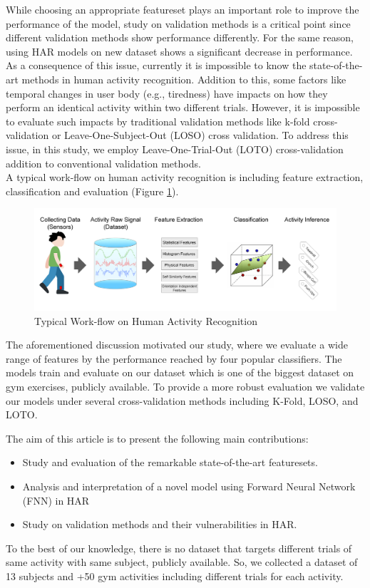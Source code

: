 \documentclass[journal,article,submit,moreauthors,pdftex]{Definitions/mdpi}
\begin{document}
While choosing an appropriate featureset plays an important role to improve the performance of the model, study on validation methods is a critical point since different validation methods show performance differently. For the same reason, using HAR models on new dataset shows a significant decrease in performance. As a consequence of this issue, currently it is impossible to know the state-of-the-art methods in human activity recognition\cite{jordao2018human}. Addition to this, some factors like temporal changes in user body (e.g., tiredness) have impacts on how they perform an identical activity within two different trials. However, it is impossible to evaluate such impacts by traditional validation methods like k-fold cross-validation or Leave-One-Subject-Out (LOSO) cross validation. To address this issue, in this study, we employ Leave-One-Trial-Out (LOTO) cross-validation addition to conventional validation methods.\\

A typical work-flow on human activity recognition is including feature extraction, classification and evaluation (Figure \ref{fig:main_approach}).

\begin{figure}[H]
	\centering
	\includegraphics[width=14 cm]{Definitions/images/main_approach.jpg}
	\caption{Typical Work-flow on Human Activity Recognition}
	\label{fig:main_approach}
\end{figure} 


The aforementioned discussion motivated our study, where we evaluate a wide range of features by the performance reached by four popular classifiers. The models train and evaluate on our dataset which is one of the biggest dataset on gym exercises, publicly available. To provide a more robust evaluation we validate our models under several cross-validation methods including K-Fold, LOSO, and LOTO.

The aim of this article is to present the following main contributions:
\begin{itemize}
	\item Study and evaluation of the remarkable state-of-the-art featuresets.
	\item Analysis and interpretation of a novel model using Forward Neural Network (FNN) in HAR
	\item Study on validation methods and their vulnerabilities in HAR.
\end{itemize}
To the best of our knowledge, there is no dataset that targets different trials of same activity with same subject, publicly available. So, we collected a dataset of 13 subjects and +50 gym activities including different trials for each activity.
\end{document}
